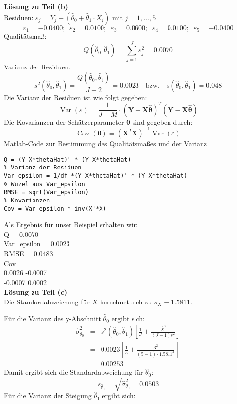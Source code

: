 \textbf{Lösung zu Teil (b)} \\
Residuen: $\varepsilon_j = Y_j -(\hat\theta _0 + \hat\theta _1 \cdot X_j)$
mit $j=1,\ldots ,5$
\[\varepsilon_1 = -0.0400; \;\; \varepsilon_2 =  0.0100;\;\;
\varepsilon_3= 0.0600;\;\; \varepsilon_4 =0.0100;\;\;
\varepsilon_5 = -0.0400
\]
Qualitätsmaß:
\[
Q(\hat\theta _0,\hat\theta _1) = \sum\limits_{j = 1}^J {\varepsilon_j ^2 } 
= 0.0070
\]
Varianz der Residuen:
\[
s^2(\hat{\theta}_0 ,\hat{\theta}_1 ) = \frac{Q(\hat{\theta}_0 ,
	\hat{\theta}_1 )}{J - 2} = 0.0023 \quad \text{bzw.} \quad
s(\hat{\theta}_0 ,\hat{\theta}_1 ) = 0.048 
\]
Die Varianz der Residuen ist wie folgt gegeben:
\begin{equation}
\operatorname{Var}(\varepsilon) = \frac{1}{J-M} \cdot \left(\mathbf Y - \mathbf X \hat{\boldsymbol\theta}\right)^T 
\left(\mathbf Y - \mathbf X \hat{\boldsymbol\theta}\right)
\end{equation}
Die Kovarianzen der Schätzerparameter ${\boldsymbol\theta}$ 
sind gegeben durch:
\begin{equation}
\operatorname{Cov}(\boldsymbol\theta) = \left(\mathbf{X}^T \mathbf X \right)^{-1}
\operatorname{Var}(\varepsilon)
\end{equation}
Matlab-Code zur Bestimmung des Qualitätsmaßes und der Varianz
\begin{lstlisting}[style=Matlab]
% Qualitaetsmass Q
Q = (Y-X*thetaHat)' * (Y-X*thetaHat)
% Varianz der Residuen
Var_epsilon = 1/df *(Y-X*thetaHat)' * (Y-X*thetaHat)
% Wuzel aus Var_epsilon
RMSE = sqrt(Var_epsilon)
% Kovarianzen
Cov = Var_epsilon * inv(X'*X)
\end{lstlisting}
Als Ergebnis für unser Beispiel erhalten wir:\\
Q = 0.0070 \\
Var\_epsilon = 0.0023\\
RMSE = 0.0483 \\
Cov = \\
0.0026   -0.0007 \\
-0.0007    0.0002 \\

\textbf{Lösung zu Teil (c)} \\
Die Standardabweichung für $X$ berechnet sich zu $s_X = 1.5811$.

Für die Varianz des y-Abschnitt $\hat\theta_0$ ergibt sich: 
\begin{eqnarray}
\hat\sigma_{\theta_0}^2 &=& s^2(\hat{\theta}_0 ,\hat{\theta}_1 )
\left[\frac{1}{J} + \frac{\bar{X}^2}{(J-1)s_x^2 } \right]
\nonumber \\ 
&=& 
0.0023
\left[\frac{1}{5} + \frac{3^2}{(5-1)\cdot 1.5811^2 } \right]
\nonumber\\ 
&=& 0.00253 \nonumber
\end{eqnarray}
Damit ergibt sich die Standardabweichung für $\hat\theta_0$:
\[
s_{\hat\theta_0} = \sqrt{\hat\sigma_{\theta_0}^2} = 0.0503
\]
Für die Varianz der Steigung $\hat\theta_1$ ergibt sich: 

